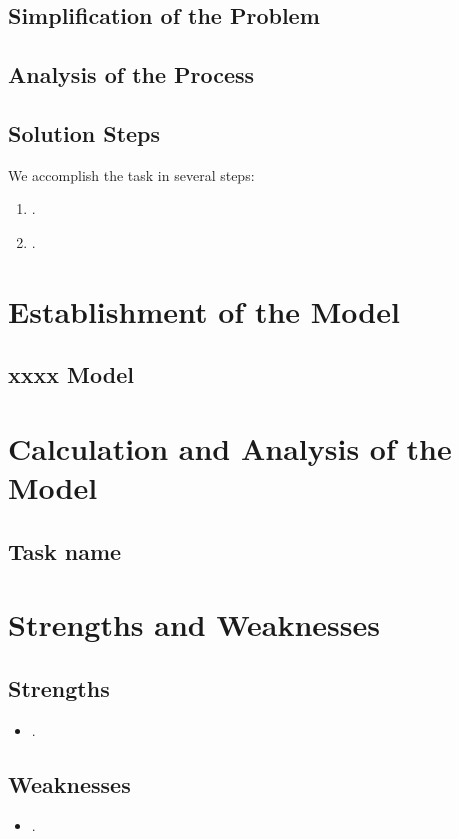 \documentclass{mcmthesis}
\begin{document}
\subsection{Simplification of the Problem}


\subsection{Analysis of the Process}


\subsection{Solution Steps}

\par We accomplish the task in several steps:
\begin{enumerate}[step 1:]
	\item .
	\item .
\end{enumerate}

\section{Establishment of the Model}

\subsection{xxxx Model}

\section{Calculation and Analysis of the Model}

\subsection{Task name}


\section{Strengths and Weaknesses}
\subsection{Strengths}
\begin{itemize} 
	\item .	
\end{itemize}
\subsection{Weaknesses}
\begin{itemize}
	\item .
\end{itemize}
\end{document}
